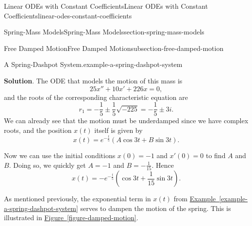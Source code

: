 \documentclass[oneside,10pt,]{book}
\numberwithin{equation}{section}
\begin{document}
\begin{chapterptx}{Linear ODEs with Constant Coefficients}{}{Linear ODEs with Constant Coefficients}{}{}{linear-odes-constant-coefficients}
\begin{sectionptx}{Spring-Mass Models}{}{Spring-Mass Models}{}{}{section-spring-mass-models}
\begin{subsectionptx}{Free Damped Motion}{}{Free Damped Motion}{}{}{subsection-free-damped-motion}
\begin{example}{A Spring-Dashpot System.}{example-a-spring-dashpot-system}
\par\smallskip%
\noindent\textbf{Solution}.\hypertarget{solution-31}{}\quad%
\hypertarget{p-219}{}%
The ODE that models the motion of this mass is%
\begin{equation*}
25x'' + 10x' + 226x = 0,
\end{equation*}
and the roots of the corresponding characteristic equation are%
\begin{equation*}
r_{1} = -\frac{1}{5} \pm \frac{1}{5}\sqrt{-225} = -\frac{1}{5}\pm3i.
\end{equation*}
We can already see that the motion must be underdamped since we have complex roots, and the position \(x(t)\) itself is given by%
\begin{equation*}
x(t) = e^{-\frac{t}{5}}(A\cos3t + B\sin3t).
\end{equation*}
%
\par
\hypertarget{p-220}{}%
Now we can use the initial conditions \(x(0) = -1\) and \(x'(0) = 0\) to find \(A\) and \(B\). Doing so, we quickly get \(A = -1\) and \(B = -\frac{1}{15}\). Hence%
\begin{equation*}
x(t) = -e^{-\frac{t}{5}}\left(\cos3t + \frac{1}{15}\sin3t\right).
\end{equation*}
%
\end{example}
\hypertarget{p-221}{}%
As mentioned previously, the exponential term in \(x(t)\) from \hyperref[example-a-spring-dashpot-system]{Example~\ref{example-a-spring-dashpot-system}} serves to dampen the motion of the spring. This is illustrated in \hyperref[figure-damped-motion]{Figure~\ref{figure-damped-motion}}.%
\begin{figure}
\centering
{
}
\end{figure}
\end{subsectionptx}
\end{sectionptx}
\end{chapterptx}
\end{document}
